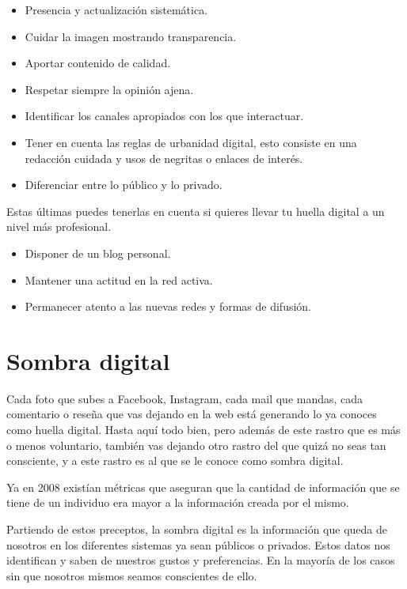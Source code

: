 \documentclass[
  a4paper,
  openany]{book}
\begin{document}
\begin{itemize}
\item
  Presencia y actualización sistemática.
\item
  Cuidar la imagen mostrando transparencia.
\item
  Aportar contenido de calidad.
\item
  Respetar siempre la opinión ajena.
\item
  Identificar los canales apropiados con los que interactuar.
\item
  Tener en cuenta las reglas de urbanidad digital, esto consiste en una redacción cuidada y usos de negritas o enlaces de interés.
\item
  Diferenciar entre lo público y lo privado.
\end{itemize}

Estas últimas puedes tenerlas en cuenta si quieres llevar tu huella digital a un nivel más profesional.

\begin{itemize}
\item
  Disponer de un blog personal.
\item
  Mantener una actitud en la red activa.
\item
  Permanecer atento a las nuevas redes y formas de difusión.
\end{itemize}

\hypertarget{sombra-digital}{%
\section{Sombra digital}\label{sombra-digital}}

Cada foto que subes a Facebook, Instagram, cada mail que mandas, cada comentario o reseña que vas dejando en la web está generando lo ya conoces como huella digital. Hasta aquí todo bien, pero además de este rastro que es más o menos voluntario, también vas dejando otro rastro del que quizá no seas tan consciente, y a este rastro es al que se le conoce como sombra digital.

Ya en 2008 existían métricas que aseguran que la cantidad de información que se tiene de un individuo era mayor a la información creada por el mismo.

Partiendo de estos preceptos, la sombra digital es la información que queda de nosotros en los diferentes sistemas ya sean públicos o privados. Estos datos nos identifican y saben de nuestros gustos y preferencias. En la mayoría de los casos sin que nosotros mismos seamos conscientes de ello.
\end{document}
